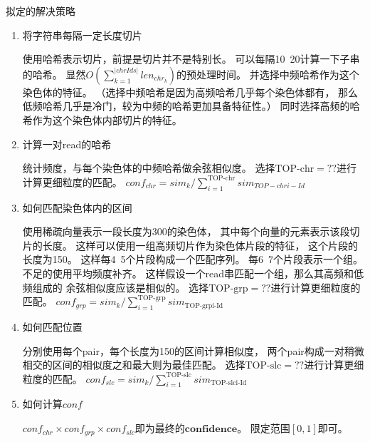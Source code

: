 \documentclass[hyperref,UTF8]{ctexart}
\theoremstyle{definition}
\theoremstyle{remark}
\numberwithin{equation}{subsection}
\newcommand{\Emph}{\textbf}
\begin{document}
	拟定的解决策略
	\begin{enumerate}
	
		\item 将字符串每隔一定长度切片
		
		使用哈希表示切片，前提是切片并不是特别长。
		可以每隔10~20计算一下子串的哈希。
		显然$O(\sum_{k=1}^{|chrIds|}{len_{chr_k}})$的预处理时间。
		并选择中频哈希作为这个染色体的特征。
		（选择中频哈希是因为高频哈希几乎每个染色体都有，
		那么低频哈希几乎是冷门，较为中频的哈希更加具备特征性。）
		同时选择高频的哈希作为这个染色体内部切片的特征。
		
		\item 计算一对read的哈希
		
		统计频度，与每个染色体的中频哈希做余弦相似度。
		选择$\text{TOP-chr} = ??$进行计算更细粒度的匹配。
		$conf_{chr} = sim_k / \sum_{i=1}^{\text{TOP-chr}}{sim_{TOP-chri-Id}}$
		
		\item 如何匹配染色体内的区间
		
		使用稀疏向量表示一段长度为300的染色体，
		其中每个向量的元素表示该段切片的长度。
		这样可以使用一组高频切片作为染色体片段的特征，
		这个片段的长度为150。
		这样每4~5个片段构成一个匹配序列。
		每6~7个片段表示一个组。
		不足的使用平均频度补齐。
		这样假设一个read串匹配一个组，那么其高频和低频组成的
		余弦相似度应该是相似的。
        选择$\text{TOP-grp} = ??$进行计算更细粒度的匹配。
		$conf_{grp} = sim_k / \sum_{i=1}^{\text{TOP-grp}}{sim_\text{TOP-grpi-Id}}$
		
		\item 如何匹配位置
		
		分别使用每个pair，每个长度为150的区间计算相似度，
		两个pair构成一对稍微相交的区间的相似度之和最大则为最佳匹配。
		选择$\text{TOP-slc} = ??$进行计算更细粒度的匹配。
		$conf_{slc} = sim_k / \sum_{i=1}^{\text{TOP-slc}}{sim_\text{TOP-slci-Id}}$
		
		\item 如何计算$conf$
		
		$conf_{chr} \times conf_{grp} \times conf_{slc}$即为最终的$\Emph{confidence}$。
		限定范围$[0,1]$即可。
		
	\end{enumerate}
	
	
\end{document}
